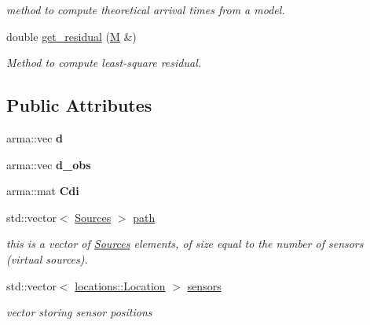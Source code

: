 \begin{DoxyCompactItemize}
\begin{DoxyCompactList}\small\item\em method to compute theoretical arrival times from a model. \end{DoxyCompactList}\item 
double \hyperlink{class_d_af616cd278b1ae31796bd5f0475205841}{get\+\_\+residual} (\hyperlink{class_m}{M} \&)
\begin{DoxyCompactList}\small\item\em Method to compute least-\/square residual. \end{DoxyCompactList}\end{DoxyCompactItemize}
\subsection*{Public Attributes}
\begin{DoxyCompactItemize}
\item 
\hypertarget{class_d_a2b8c8d96c2d740e7c5190902a5989fd0}{}arma\+::vec {\bfseries d}\label{class_d_a2b8c8d96c2d740e7c5190902a5989fd0}

\item 
\hypertarget{class_d_ac4ae5f24a1d28e0f9ead82e3d2ceb6da}{}arma\+::vec {\bfseries d\+\_\+obs}\label{class_d_ac4ae5f24a1d28e0f9ead82e3d2ceb6da}

\item 
\hypertarget{class_d_ac980b27c922d177de65224fff98ad8e2}{}arma\+::mat {\bfseries Cdi}\label{class_d_ac980b27c922d177de65224fff98ad8e2}

\item 
\hypertarget{class_d_aa525d3826786c43ac8a2a7bbad2131a9}{}std\+::vector$<$ \hyperlink{class_sources}{Sources} $>$ \hyperlink{class_d_aa525d3826786c43ac8a2a7bbad2131a9}{path}\label{class_d_aa525d3826786c43ac8a2a7bbad2131a9}

\begin{DoxyCompactList}\small\item\em this is a vector of \hyperlink{class_sources}{Sources} elements, of size equal to the number of sensors (virtual sources). \end{DoxyCompactList}\item 
\hypertarget{class_d_a6d2c6be7472058d3a1d30a914a767aba}{}std\+::vector$<$ \hyperlink{classlocations_1_1_location}{locations\+::\+Location} $>$ \hyperlink{class_d_a6d2c6be7472058d3a1d30a914a767aba}{sensors}\label{class_d_a6d2c6be7472058d3a1d30a914a767aba}

\begin{DoxyCompactList}\small\item\em vector storing sensor positions \end{DoxyCompactList}\end{DoxyCompactItemize}


